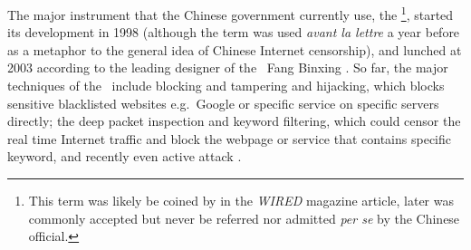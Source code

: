 The major instrument that the Chinese government currently use, the \gfw\footnote{This term was likely be coined by \citet{barme_great_1997} in the \textit{WIRED} magazine article, later was commonly accepted but never be referred nor admitted \textit{per se} by the Chinese official.}, started its development in 1998 (although the term was used \textit{avant la lettre} a year before as a metaphor to the general idea of Chinese Internet censorship), and lunched at 2003 according to the leading designer of the \gfw\ Fang Binxing \citep{global_times_great_2011}. So far, the major techniques of the \gfw\ include  blocking and  tampering and hijacking, which blocks sensitive blacklisted websites e.g.\ Google or specific service on specific servers directly; the deep packet inspection and keyword filtering, which could censor the real time Internet traffic and block the webpage or service that contains specific keyword, and recently even active attack \citep{xu_deconstructing_2016,yuen_becoming_2015,perlroth_chinese_2015}.


